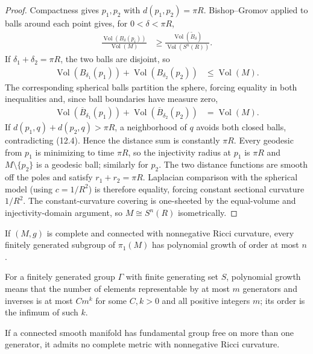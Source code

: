 \begin{proof}
\sketch
Compactness gives $p_1,p_2$ with $d(p_1,p_2)=\pi R$.  Bishop--Gromov applied
to balls around each point gives, for $0<\delta<\pi R$,
\begin{align}
\frac{\operatorname{Vol}(B_\delta(p_i))}{\operatorname{Vol}(M)}
&\geq\frac{\operatorname{Vol}(\widetilde B_\delta)}
{\operatorname{Vol}(S^n(R))}. \label{eq:12.2}
\end{align}
If $\delta_1+\delta_2=\pi R$, the two balls are disjoint, so
\begin{align}
\operatorname{Vol}(B_{\delta_1}(p_1))
+\operatorname{Vol}(B_{\delta_2}(p_2))&\leq\operatorname{Vol}(M). \label{eq:12.3}
\end{align}
The corresponding spherical balls partition the sphere, forcing equality in
both inequalities and, since ball boundaries have measure zero,
\begin{align}
\operatorname{Vol}(\overline B_{\delta_1}(p_1))
+\operatorname{Vol}(\overline B_{\delta_2}(p_2))&=\operatorname{Vol}(M). \label{eq:12.4}
\end{align}
If $d(p_1,q)+d(p_2,q)>\pi R$, a neighborhood of $q$ avoids both closed balls,
contradicting (12.4).  Hence the distance sum is constantly $\pi R$.
Every geodesic from $p_1$ is minimizing to time $\pi R$, so the injectivity
radius at $p_1$ is $\pi R$ and $M\setminus\{p_2\}$ is a geodesic ball; similarly
for $p_2$.  The two distance functions are smooth off the poles and satisfy
$r_1+r_2=\pi R$.  Laplacian comparison with the spherical model (using
$c=1/R^2$) is therefore equality, forcing constant sectional curvature
$1/R^2$.  The constant-curvature covering is one-sheeted by the equal-volume
and injectivity-domain argument, so $M\cong S^n(R)$ isometrically.
\end{proof}

\begin{theorem}[Milnor]
\label{thm:milnor-polynomial-growth}
If $(M,g)$ is complete and connected with nonnegative Ricci curvature, every
finitely generated subgroup of $\pi_1(M)$ has polynomial growth of order at
most $n$.
\end{theorem}

For a finitely generated group $\Gamma$ with finite generating set $S$,
polynomial growth means that the number of elements representable by at most
$m$ generators and inverses is at most $Cm^k$ for some $C,k>0$ and all positive
integers $m$; its order is the infimum of such $k$.

\begin{corollary}
\label{cor:free-fund-group-no-ric-metric}

If a connected smooth manifold has fundamental group free on more than one
generator, it admits no complete metric with nonnegative Ricci curvature.
\end{corollary}

